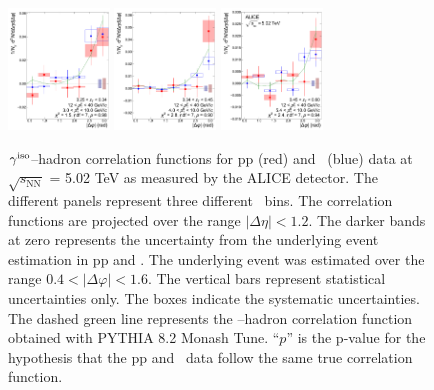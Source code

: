 \begin{figure}
    \includegraphics[width=0.24\textwidth]{Data_Analysis/gammahadron/Cs_Final_Indv_pT_0_zT_5.pdf}        
    \includegraphics[width=0.24\textwidth]{Data_Analysis/gammahadron/Cs_Final_Indv_pT_0_zT_6.pdf}        
    \includegraphics[width=0.24\textwidth]{Data_Analysis/gammahadron/Cs_Final_Indv_pT_0_zT_7.pdf}
    \caption{$\gamma^\mathrm{iso}$--hadron correlation functions for pp (red) and \pPb~(blue) data at $\sqrt{s_\mathrm{NN}}$ = 5.02 TeV as measured by the ALICE detector. The different panels represent three different \zt~bins. The correlation functions are projected over the range $|\Delta\eta| < 1.2$. The darker bands at zero represents the uncertainty from the underlying event estimation in pp and \pPb. The underlying event was estimated over the range $0.4 <|\Delta\varphi| < 1.6$. The vertical bars represent statistical uncertainties only. The boxes indicate the systematic uncertainties. The dashed green line represents the \gammaiso--hadron correlation function obtained with \textsc{PYTHIA 8.2} Monash Tune. ``$p$'' is the p-value for the hypothesis that the pp and \pPb~data follow the same true correlation function.}
    \label{fig:GH_Correlations}
 \end{figure}
\FloatBarrier

